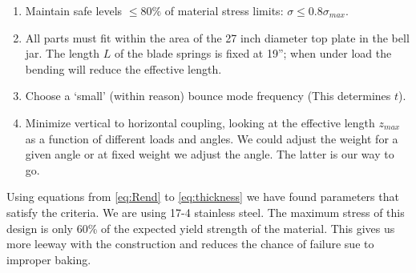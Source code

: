 \begin{enumerate}
	\item Maintain safe levels $\leq 80\%$ of material stress limits:
	$\sigma\leq0.8\sigma_{max}$.
  \item All parts must fit within the area of the 27 inch diameter top plate in the bell jar. The length $L$ of the blade springs is fixed at 19''; when under load the bending will reduce the effective length.
  \item Choose a `small' (within reason) bounce mode frequency (This determines $t$). 
	\item Minimize vertical to horizontal coupling, looking at the effective length $z_{max}$ as a function of different loads and angles. We could adjust the weight for a given angle or at fixed weight we adjust the angle. The latter is our way to go.
	
\end{enumerate}
Using equations from \ref{eq:Rend} to \ref{eq:thickness}
we have found parameters that satisfy the criteria.  We are using 17-4 stainless steel.  The maximum stress of this design is only 60\% of the expected yield strength of the material.  This gives us more leeway with the construction and reduces the chance of failure sue to improper baking.  


